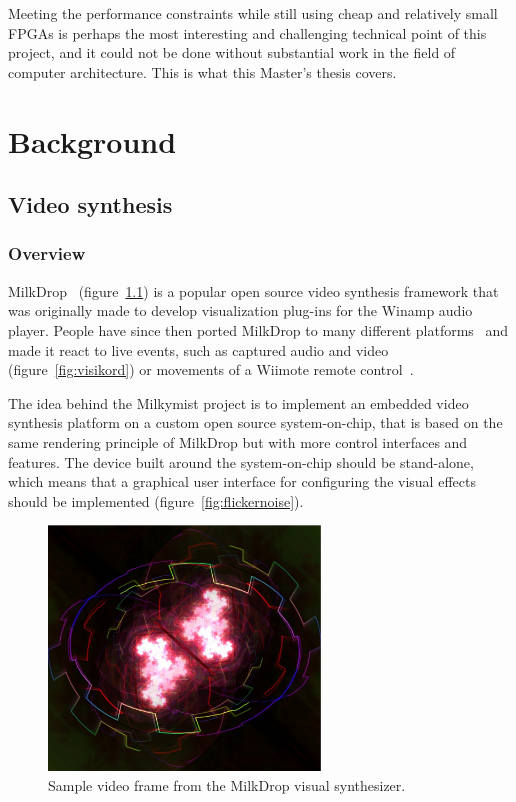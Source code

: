 \documentclass[a4paper,11pt]{kthesis}
\begin{document}
Meeting the performance constraints while still using cheap and relatively small FPGAs is perhaps the most interesting and challenging technical point of this project, and it could not be done without substantial work in the field of computer architecture. This is what this Master's thesis covers.

\chapter{Background}
\section{Video synthesis}
\subsection{Overview}
MilkDrop~\cite{milkdrop} (figure~\ref{fig:milkdrop}) is a popular open source video synthesis framework that was originally made to develop visualization plug-ins for the Winamp audio player. People have since then ported MilkDrop to many different platforms~\cite{wpmilkdrop} and made it react to live events, such as captured audio and video~\cite{visikord} (figure~\ref{fig:visikord}) or movements of a Wiimote remote control~\cite{wiimodemd}.

The idea behind the Milkymist project is to implement an embedded video synthesis platform on a custom open source system-on-chip, that is based on the same rendering principle of MilkDrop but with more control interfaces and features. The device built around the system-on-chip should be stand-alone, which means that a graphical user interface for configuring the visual effects should be implemented (figure~\ref{fig:flickernoise}).

\begin{figure}[htp]
\centering
\includegraphics[height=65mm]{milkdrop2.eps}
\caption{Sample video frame from the MilkDrop visual synthesizer.}
\label{fig:milkdrop}
\end{figure}
\end{document}
